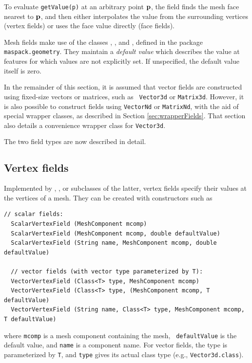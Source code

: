 To evaluate {\tt getValue(p)} at an arbitrary point ${\bf p}$, the field
finds the mesh face nearest to ${\bf p}$, and then either interpolates the
value from the surrounding vertices (vertex fields) or uses the face
value directly (face fields).

Mesh fields make use of the classes
,
, and
, defined in the package
{\tt maspack.geometry}.  They maintain a {\it default value} which
describes the value at features for which values are not explicitly
set. If unspecified, the default value itself is zero.

In the remainder of this section, it is assumed that vector fields are
constructed using fixed-size vectors or matrices, such as {\tt
Vector3d} or {\tt Matrix3d}.  However, it is also possible to
construct fields using {\tt VectorNd} or {\tt MatrixNd}, with the aid
of special wrapper classes, as described in Section
\ref{sec:wrapperFields}. That section also details a convenience
wrapper class for {\tt Vector3d}.

The two field types are now described in detail.

\subsection{Vertex fields}

Implemented by
,
, 
or subclasses of the latter, vertex fields specify their values at the
vertices of a mesh. They can be created with constructors such as
%
\begin{lstlisting}[]
  // scalar fields:
  ScalarVertexField (MeshComponent mcomp)
  ScalarVertexField (MeshComponent mcomp, double defaultValue)
  ScalarVertexField (String name, MeshComponent mcomp, double defaultValue)

  // vector fields (with vector type parameterized by T):
  VectorVertexField (Class<T> type, MeshComponent mcomp)
  VectorVertexField (Class<T> type, (MeshComponent mcomp, T defaultValue)
  VectorVertexField (String name, Class<T> type, MeshComponent mcomp, T defaultValue)
\end{lstlisting}
%
where {\tt mcomp} is a mesh component containing the mesh, {\tt
defaultValue} is the default value, and {\tt name} is a component
name. For vector fields, the 
type is parameterized by {\tt T}, and {\tt type} gives its actual
class type (e.g., {\tt Vector3d.class}).

